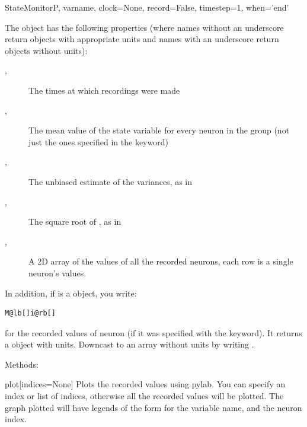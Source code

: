 \documentclass[letterpaper,10pt,english]{manual}
\begin{document}
\begin{classdesc}{StateMonitor}{P, varname, clock=None, record=False, timestep=1, when='end'}
\begin{description}
\end{description}

The \hyperlink{brian.StateMonitor}{} object has the following properties (where names
without an underscore return  objects with appropriate
units and names with an underscore return  objects without
units):
\begin{description}
\item[, ]
The times at which recordings were made

\item[, ]
The mean value of the state variable for every neuron in the
group (not just the ones specified in the  keyword)

\item[, ]
The unbiased estimate of the variances, as in 

\item[, ]
The square root of , as in 

\item[, ]
A 2D array of the values of all the recorded neurons, each row is a
single neuron's values.

\end{description}

In addition, if  is a \hyperlink{brian.StateMonitor}{} object, you write:

\begin{Verbatim}[commandchars=@\[\]]
M@lb[]i@rb[]
\end{Verbatim}

for the recorded values of neuron  (if it was specified with the
 keyword). It returns a  object with units. Downcast
to an array without units by writing .

Methods:

\hypertarget{brian.StateMonitor.plot}{}\begin{methoddesc}{plot}{{[}indices=None{]}}
Plots the recorded values using pylab. You can specify an index or
list of indices, otherwise all the recorded values will be plotted.
The graph plotted will have legends of the form  for
 the variable name, and  the neuron index.
\end{methoddesc}
\end{classdesc}
\end{document}
